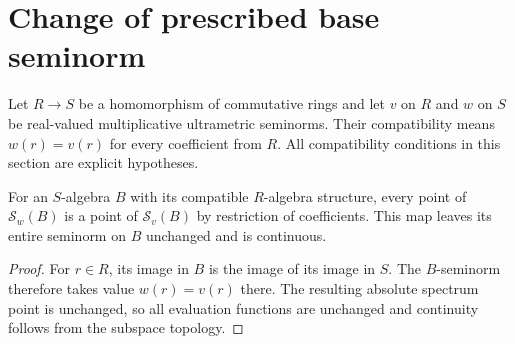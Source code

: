 \section{Change of prescribed base seminorm}\label{sec:general-base-change}

Let $R\to S$ be a homomorphism of commutative rings and let $v$ on $R$
and $w$ on $S$ be real-valued multiplicative ultrametric seminorms.
Their compatibility means $w(r)=v(r)$ for every coefficient from $R$.
All compatibility conditions in this section are explicit hypotheses.

\begin{definition}
\label{spectrum:scalar-restriction}
\leanok
{}
For an $S$-algebra $B$ with its compatible $R$-algebra structure,
every point of $\mathcal S_w(B)$ is a point of $\mathcal S_v(B)$
by restriction of coefficients. This map leaves its entire seminorm
on $B$ unchanged and is continuous.
\end{definition}
\begin{proof}
For $r\in R$, its image in $B$ is the image of its image in $S$.
The $B$-seminorm therefore takes value $w(r)=v(r)$ there.
The resulting absolute spectrum point is unchanged, so all evaluation
functions are unchanged and continuity follows from the subspace topology.
\end{proof}

